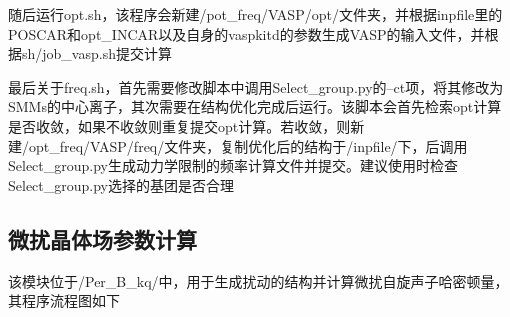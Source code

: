 \documentclass[UTF8]{ctexart}
\begin{document}
随后运行opt.sh，该程序会新建/pot\_freq/VASP/opt/文件夹，并根据inpfile里的POSCAR和opt\_INCAR以及自身的vaspkitd的参数生成VASP的输入文件，并根据sh/job\_vasp.sh提交计算

最后关于freq.sh，首先需要修改脚本中调用Select\_group.py的--ct项，将其修改为SMMs的中心离子，其次需要在结构优化完成后运行。该脚本会首先检索opt计算是否收敛，如果不收敛则重复提交opt计算。若收敛，则新建/opt\_freq/VASP/freq/文件夹，复制优化后的结构于/inpfile/下，后调用Select\_group.py生成动力学限制的频率计算文件并提交。建议使用时检查Select\_group.py选择的基团是否合理

\subsection{微扰晶体场参数计算}
该模块位于/Per\_B\_kq/中，用于生成扰动的结构并计算微扰自旋声子哈密顿量，其程序流程图如下
\end{document}
